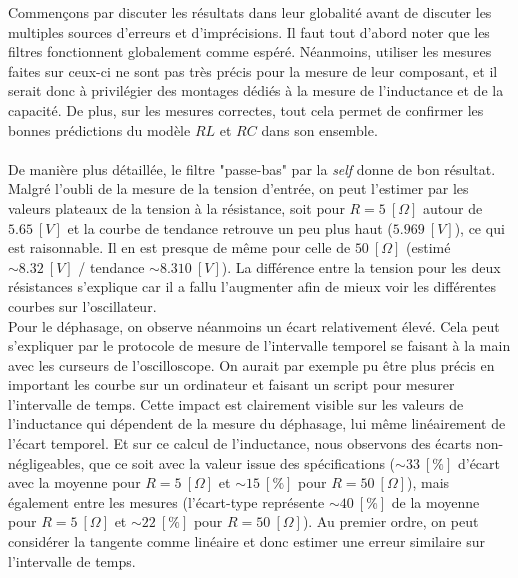 Commençons par discuter les résultats dans leur globalité avant de discuter les multiples sources d'erreurs et d’imprécisions. Il faut tout d'abord noter que les filtres fonctionnent globalement comme espéré. Néanmoins, utiliser les mesures faites sur ceux-ci ne sont pas très précis pour la mesure de leur composant, et il serait donc à privilégier des montages dédiés à la mesure de l'inductance et de la capacité. De plus, sur les mesures correctes, tout cela permet de confirmer les bonnes prédictions du modèle $RL$ et $RC$ dans son ensemble.\\ \\
De manière plus détaillée, le filtre "passe-bas" par la \textit{self} donne de bon résultat. Malgré l'oubli de la mesure de la tension d'entrée, on peut l'estimer par les valeurs plateaux de la tension à la résistance, soit pour $R=5 \ [\Omega]$ autour de $5.65 \ [V]$ et la courbe de tendance retrouve un peu plus haut ($5.969 \ [V]$), ce qui est raisonnable. Il en est presque de même pour celle de $50 \ [\Omega]$ (estimé $\sim 8.32 \ [V]$ / tendance $\sim 8.310 \ [V]$). La différence entre la tension pour les deux résistances s'explique car il a fallu l'augmenter afin de mieux voir les différentes courbes sur l'oscillateur.\\
Pour le déphasage, on observe néanmoins un écart relativement élevé. Cela peut s'expliquer par le protocole de mesure de l'intervalle temporel se faisant à la main avec les curseurs de l'oscilloscope. On aurait par exemple pu être plus précis en important les courbe sur un ordinateur et faisant un script pour mesurer l'intervalle de temps. Cette impact est clairement visible sur les valeurs de l'inductance qui dépendent de la mesure du déphasage, lui même linéairement de l'écart temporel. Et sur ce calcul de l’inductance, nous observons des écarts non-négligeables, que ce soit avec la valeur issue des spécifications ($\sim 33 \ [\%]$ d'écart avec la moyenne pour $R=5 \ [\Omega]$ et $\sim 15 \ [\%]$ pour $R=50 \ [\Omega]$), mais également entre les mesures (l'écart-type représente $\sim 40 \ [\%]$ de la moyenne pour $R=5 \ [\Omega]$ et $\sim 22 \ [\%]$ pour $R=50 \ [\Omega]$). Au premier ordre, on peut considérer la tangente comme linéaire et donc estimer une erreur similaire sur l'intervalle de temps.\\
